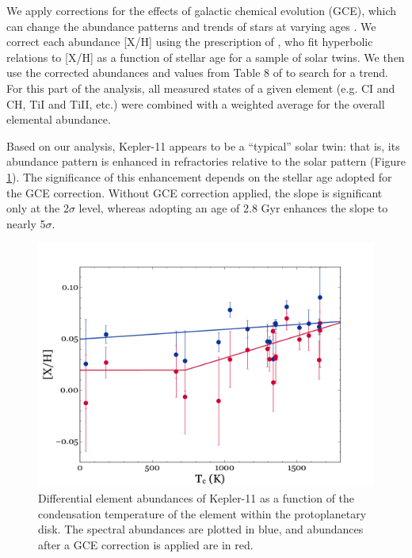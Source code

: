 \documentclass[oneside]{emulateapj}
\begin{document}
We apply corrections for the effects of galactic chemical evolution (GCE), which can change the abundance patterns and \tc trends of stars at varying ages \citep{Nissen2015, Spina2016}. We correct each abundance [X/H] using the prescription of \citet{Spina2016b}, who fit hyperbolic relations to [X/H] as a function of stellar age for a sample of solar twins. We then use the corrected abundances and \tc values from Table 8 of \citet{Lodders2003} to search for a trend. For this part of the analysis, all measured states of a given element (e.g. CI and CH, TiI and TiII, etc.) were combined with a weighted average for the overall elemental abundance. %

Based on our analysis, Kepler-11 appears to be a ``typical'' solar twin: that is, its abundance pattern is enhanced in refractories relative to the solar pattern (Figure \ref{fig:tc}). The significance of this enhancement depends on the stellar age adopted for the GCE correction. Without GCE correction applied, the \tc slope is significant only at the 2$\sigma$ level, whereas adopting an age of 2.8 Gyr enhances the slope to nearly 5$\sigma$. 

\begin{figure}
\centering
\includegraphics[width=\columnwidth]{K11_Tc_break}
\caption{Differential element abundances of Kepler-11 as a function of the condensation temperature of the element within the protoplanetary disk. The spectral abundances are plotted in blue, and abundances after a GCE correction is applied are in red. }
\label{fig:tc}
\end{figure}
\end{document}
